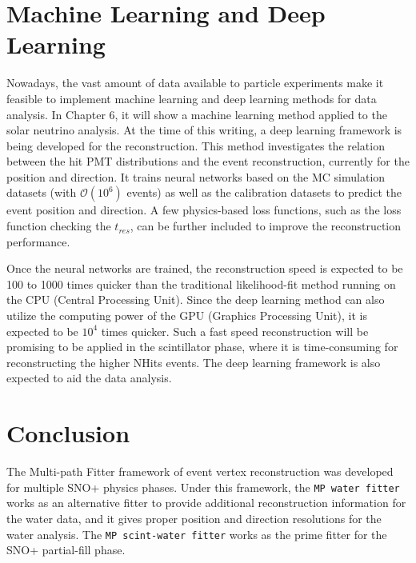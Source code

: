 \section{Machine Learning and Deep Learning}
Nowadays, the vast amount of data available to particle experiments make it feasible to implement machine learning and deep learning methods for data analysis. In Chapter 6, it will show a machine learning method applied to the solar neutrino analysis. At the time of this writing, a deep learning framework is being developed for the reconstruction\cite{markMachineLearning,markNeuralTalk,markNeuralNetwork}. This method investigates the relation between the hit PMT distributions and the event reconstruction, currently for the position and direction. It trains neural networks based on the MC simulation datasets (with $\mathcal{O}(10^6)$ events) as well as the calibration datasets to predict the event position and direction\cite{markNeuralTalk}. A few physics-based loss functions, such as the loss function checking the $t_{res}$, can be further included to improve the reconstruction performance\cite{markNeuralTalk}. 

Once the neural networks are trained, the reconstruction speed is expected to be 100 to 1000 times quicker than the traditional likelihood-fit method running on the CPU (Central Processing Unit). Since the deep learning method can also utilize the computing power of the GPU (Graphics Processing Unit), it is expected to be $10^4$ times quicker\cite{markNeuralTalk,markNeuralNetwork}. Such a fast speed reconstruction will be promising to be applied in the scintillator phase, where it is time-consuming for reconstructing the higher NHits events. The deep learning framework is also expected to aid the data analysis.

\section{Conclusion}
The Multi-path Fitter framework of event vertex reconstruction was developed for multiple SNO+ physics phases. Under this framework, the \texttt{MP water fitter} works as an alternative fitter to provide additional reconstruction information for the water data, and it gives proper position and direction resolutions for the water analysis. The \texttt{MP scint-water fitter} works as the prime fitter for the SNO+ partial-fill phase.
